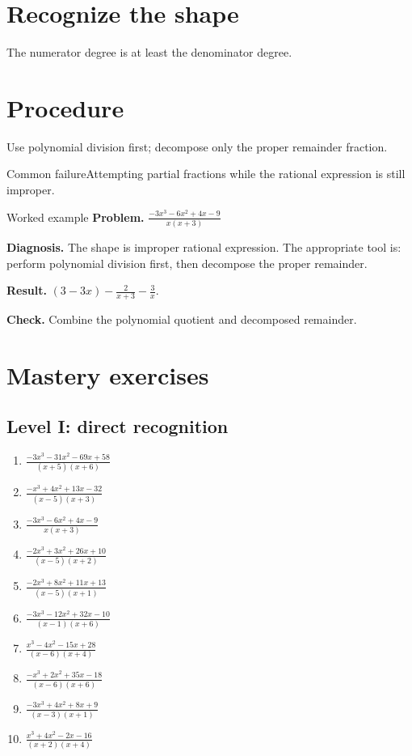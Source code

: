 \documentclass[11pt,oneside]{book}
\begin{document}
\section{Recognize the shape}
The numerator degree is at least the denominator degree.
\section{Procedure}
Use polynomial division first; decompose only the proper remainder fraction.

\begin{warningbox}{Common failure}Attempting partial fractions while the rational expression is still improper.\end{warningbox}
\begin{examplebox}{Worked example}
\textbf{Problem.} $\displaystyle \frac{- 3 x^{3} - 6 x^{2} + 4 x - 9}{x \left(x + 3\right)}$

\textbf{Diagnosis.} The shape is improper rational expression. The appropriate tool is: perform polynomial division first, then decompose the proper remainder.

\textbf{Result.} $\displaystyle \left(3 - 3 x\right) - \frac{2}{x + 3} - \frac{3}{x}$.

\textbf{Check.} Combine the polynomial quotient and decomposed remainder.
\end{examplebox}
\section{Mastery exercises}
\subsection*{Level I: direct recognition}
\begin{enumerate}[leftmargin=*,label=\textbf{\arabic*.},itemsep=0.65\baselineskip]
\item $\displaystyle \frac{- 3 x^{3} - 31 x^{2} - 69 x + 58}{\left(x + 5\right) \left(x + 6\right)}$
\item $\displaystyle \frac{- x^{3} + 4 x^{2} + 13 x - 32}{\left(x - 5\right) \left(x + 3\right)}$
\item $\displaystyle \frac{- 3 x^{3} - 6 x^{2} + 4 x - 9}{x \left(x + 3\right)}$
\item $\displaystyle \frac{- 2 x^{3} + 3 x^{2} + 26 x + 10}{\left(x - 5\right) \left(x + 2\right)}$
\item $\displaystyle \frac{- 2 x^{3} + 8 x^{2} + 11 x + 13}{\left(x - 5\right) \left(x + 1\right)}$
\item $\displaystyle \frac{- 3 x^{3} - 12 x^{2} + 32 x - 10}{\left(x - 1\right) \left(x + 6\right)}$
\item $\displaystyle \frac{x^{3} - 4 x^{2} - 15 x + 28}{\left(x - 6\right) \left(x + 4\right)}$
\item $\displaystyle \frac{- x^{3} + 2 x^{2} + 35 x - 18}{\left(x - 6\right) \left(x + 6\right)}$
\item $\displaystyle \frac{- 3 x^{3} + 4 x^{2} + 8 x + 9}{\left(x - 3\right) \left(x + 1\right)}$
\item $\displaystyle \frac{x^{3} + 4 x^{2} - 2 x - 16}{\left(x + 2\right) \left(x + 4\right)}$
\end{enumerate}
\end{document}
